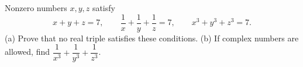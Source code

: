 Nonzero numbers $x,y,z$ satisfy
\[
x+y+z=7,\qquad \dfrac{1}{x}+\dfrac{1}{y}+\dfrac{1}{z}=7,\qquad x^3+y^3+z^3=7.
\]
(a) Prove that no real triple satisfies these conditions.
(b) If complex numbers are allowed, find $\dfrac{1}{x^3}+\dfrac{1}{y^3}+\dfrac{1}{z^3}$.
